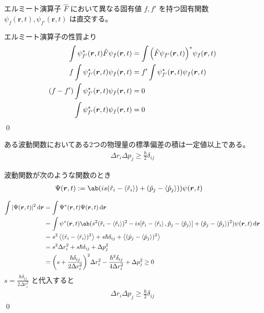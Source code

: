 \documentclass[uplatex,dvipdfmx,a4paper,11pt]{jlreq}
\makeatletter
\newcommand{\rr}{\bm{r}}
\numberwithin{equation}{section}
\theoremstyle{definition}
\renewenvironment{proof}[1][\proofname]{\par
  \normalfont
  \topsep6\p@\@plus6\p@ \trivlist
  \item[\hskip\labelsep{\bfseries #1}\@addpunct{\bfseries}]\ignorespaces\quad\par
}{%
  \qed\endtrivlist\@endpefalse
}
\renewcommand\proofname{証明}
\makeatother
\begin{document}
\begin{theorem}
  エルミート演算子 $\hat{F}$ において異なる固有値 $f, f'$ を持つ固有関数 $\psi_f(\rr, t), \psi_{f'}(\rr, t)$ は直交する。
\end{theorem}
\begin{proof}
  エルミート演算子の性質より
  \begin{align}
    \int\psi_{f'}^*(\rr, t)\hat{F}\psi_f(\rr, t)  & = \int\qty(\hat{F}\psi_{f'}(\rr, t))^*\psi_f(\rr, t) \\
    f\int\psi_{f'}^*(\rr, t)\psi_f(\rr, t)        & = f'\int\psi_{f'}^*(\rr, t)\psi_f(\rr, t)            \\
    (f - f')\int\psi_{f'}^*(\rr, t)\psi_f(\rr, t) & = 0                                                  \\
    \int\psi_{f'}^*(\rr, t)\psi_f(\rr, t)         & = 0
  \end{align}
\end{proof}

\begin{theorem}[不確定性原理]
  ある波動関数においてある2つの物理量の標準偏差の積は一定値以上である。
  \begin{align}
    \Delta r_i\Delta p_j \geq \frac{\hbar}{2}\delta_{ij}
  \end{align}
\end{theorem}
\begin{proof}
  波動関数が次のような関数のとき
  \begin{align}
    \Psi(\rr, t) & := \ab(is(\hat{r}_i - \ev{\hat{r}_i}) + (\hat{p}_j - \ev{\hat{p}_j}))\psi(\rr, t)
  \end{align}

  \begin{align}
    \int|\Psi(\rr, t)|^2\dd{\rr} & = \int\Psi^*(\rr, t)\Psi(\rr, t)\dd{\rr}                                                                                                                                     \\
                                 & = \int\psi^*(\rr, t)\ab(s^2(\hat{r}_i - \ev{\hat{r}_i})^2 - is[\hat{r}_i - \ev{\hat{r}_i}, \hat{p}_j - \ev{\hat{p}_j}] + (\hat{p}_j - \ev{\hat{p}_j})^2)\psi(\rr, t)\dd{\rr} \\
                                 & = s^2\ev{(\hat{r}_i - \ev{\hat{r}_i})^2} + s\hbar\delta_{ij} + \ev{(\hat{p}_j - \ev{\hat{p}_j})^2}                                                                           \\
                                 & = s^2\Delta r_i^2 + s\hbar\delta_{ij} + \Delta p_j^2                                                                                                                         \\
                                 & = \qty(s + \frac{\hbar\delta_{ij}}{2\Delta r_i^2})^2\Delta r_i^2 - \frac{\hbar^2\delta_{ij}}{4\Delta r_i^2} + \Delta p_j^2 \geq 0
  \end{align}
  $s = \frac{\hbar\delta_{ij}}{2\Delta r_i^2}$ と代入すると
  \begin{align}
    \Delta r_i\Delta p_j \geq \frac{\hbar}{2}\delta_{ij}
  \end{align}
\end{proof}
\end{document}
